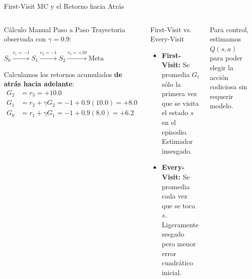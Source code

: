 \begin{frame}{First-Visit MC y el Retorno hacia Atrás}
  \begin{columns}[T,onlytextwidth]
      \begin{exampleblock}{Cálculo Manual Paso a Paso}
        Trayectoria observada con $\gamma = 0.9$:
        \begin{center}
          $S_0 \xrightarrow{r_1=-1} S_1 \xrightarrow{r_2=-1} S_2 \xrightarrow{r_3=+10} \text{Meta}$
        \end{center}
        Calculamos los retornos acumulados \textbf{de atrás hacia adelante}:
        \begin{align*}
          G_2 &= r_3 = \mathbf{+10.0} \\
          G_1 &= r_2 + \gamma G_2 = -1 + 0.9(10.0) = \mathbf{+8.0} \\
          G_0 &= r_1 + \gamma G_1 = -1 + 0.9(8.0) = \mathbf{+6.2}
        \end{align*}
      \end{exampleblock}
      \begin{block}{First-Visit vs. Every-Visit}
        \begin{itemize}
          \item \textbf{First-Visit:} Se promedia $G_t$ sólo la primera vez que se visita el estado $s$ en el episodio. Estimador insesgado.
          \item \textbf{Every-Visit:} Se promedia cada vez que se toca $s$. Ligeramente sesgado pero menor error cuadrático inicial.
        \end{itemize}
      \end{block}
      \vspace{0.2cm}
      \small Para control, estimamos $Q(s,a)$ para poder elegir la acción codiciosa sin requerir modelo.
  \end{columns}
\end{frame}

